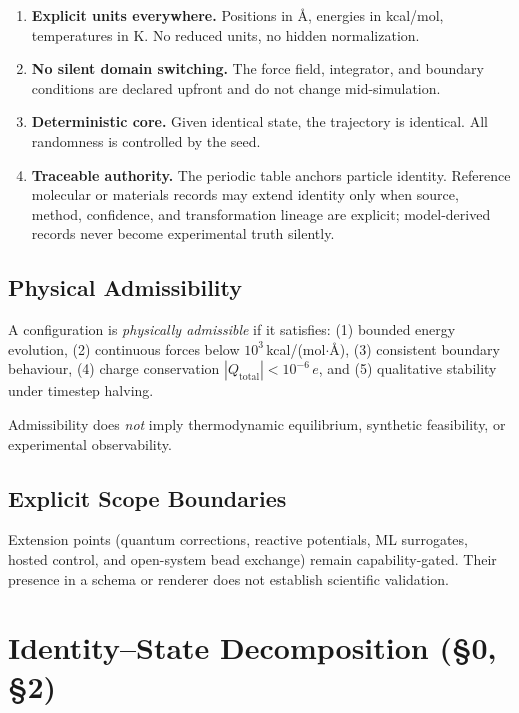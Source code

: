 \documentclass[11pt, a4paper]{article}
\begin{document}
\begin{enumerate}
\item \textbf{Explicit units everywhere.}  Positions in \AA, energies in kcal/mol, temperatures in K.  No reduced units, no hidden normalization.

\item \textbf{No silent domain switching.}  The force field, integrator, and boundary conditions are declared upfront and do not change mid-simulation.

\item \textbf{Deterministic core.}  Given identical state, the trajectory is identical.  All randomness is controlled by the seed.

\item \textbf{Traceable authority.} The periodic table anchors particle identity. Reference molecular or materials records may extend identity only when source, method, confidence, and transformation lineage are explicit; model-derived records never become experimental truth silently.
\end{enumerate}

\subsection{Physical Admissibility}

A configuration is \emph{physically admissible} if it satisfies:
(1) bounded energy evolution,
(2) continuous forces below $10^3$\,kcal/(mol$\cdot$\AA),
(3) consistent boundary behaviour,
(4) charge conservation $|Q_\text{total}| < 10^{-6}\,e$, and
(5) qualitative stability under timestep halving.

Admissibility does \emph{not} imply thermodynamic equilibrium, synthetic feasibility, or experimental observability.

\subsection{Explicit Scope Boundaries}

Extension points (quantum corrections, reactive potentials, ML surrogates, hosted control, and open-system bead exchange) remain capability-gated. Their presence in a schema or renderer does not establish scientific validation.


\section{Identity--State Decomposition (\S0, \S2)}
\end{document}
